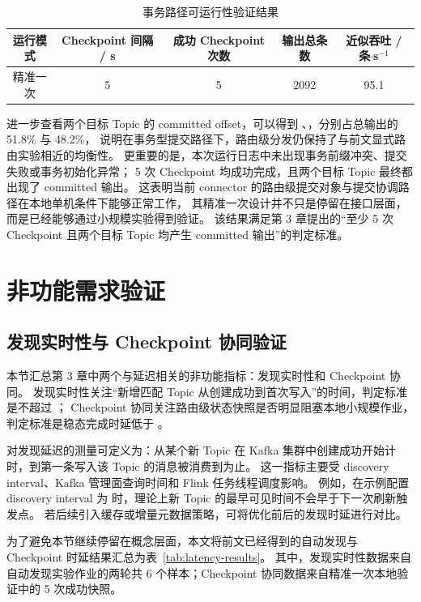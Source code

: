 \begin{table}[htbp]
  \centering
  \caption{事务路径可运行性验证结果}
  \label{tab:exactly-once-validation}
  \begin{tabular}{ccccc}
    \toprule
    运行模式 & Checkpoint 间隔 / s & 成功 Checkpoint 次数 & 输出总条数 & 近似吞吐 / 条$\cdot$s$^{-1}$ \\
    \midrule
    精准一次 & 5 & 5 & 2092 & 95.1 \\
    \bottomrule
  \end{tabular}
\end{table}

进一步查看两个目标 Topic 的 committed offset，可以得到
、，分别占总输出的 51.8\% 与 48.2\%，
说明在事务型提交路径下，路由级分发仍保持了与前文显式路由实验相近的均衡性。
更重要的是，本次运行日志中未出现事务前缀冲突、提交失败或事务初始化异常；
5 次 Checkpoint 均成功完成，且两个目标 Topic 最终都出现了 committed 输出。
这表明当前 connector 的路由级提交对象与提交协调路径在本地单机条件下能够正常工作，
其精准一次设计并不只是停留在接口层面，而是已经能够通过小规模实验得到验证。
该结果满足第 3 章提出的“至少 5 次 Checkpoint 且两个目标 Topic 均产生 committed 输出”的判定标准。

\section{非功能需求验证}

\subsection{发现实时性与 Checkpoint 协同验证}

本节汇总第 3 章中两个与延迟相关的非功能指标：发现实时性和 Checkpoint 协同。
发现实时性关注“新增匹配 Topic 从创建成功到首次写入”的时间，判定标准是不超过 ；
Checkpoint 协同关注路由级状态快照是否明显阻塞本地小规模作业，判定标准是稳态完成时延低于 。

对发现延迟的测量可定义为：从某个新 Topic 在 Kafka 集群中创建成功开始计时，到第一条写入该 Topic 的消息被消费到为止。
这一指标主要受 discovery interval、Kafka 管理面查询时间和 Flink 任务线程调度影响。
例如，在示例配置 discovery interval 为  时，理论上新 Topic 的最早可见时间不会早于下一次刷新触发点。
若后续引入缓存或增量元数据策略，可将优化前后的发现时延进行对比。

为了避免本节继续停留在概念层面，本文将前文已经得到的自动发现与 Checkpoint 时延结果汇总为表~\ref{tab:latency-results}。
其中，发现实时性数据来自自动发现实验作业的两轮共 6 个样本；Checkpoint 协同数据来自精准一次本地验证中的 5 次成功快照。

